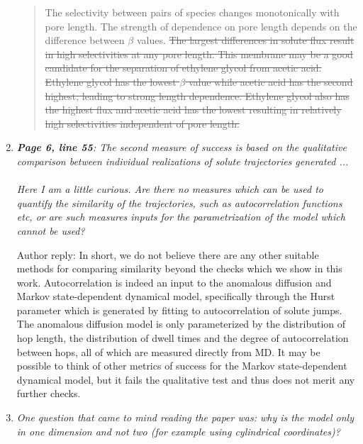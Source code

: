 \documentclass{article}
\begin{document}
\begin{enumerate}[label={Comment \theenumi :}, leftmargin=3.9\parindent]
\begin{quote}
          The selectivity between pairs of species changes monotonically with
	      pore length. The strength of dependence on pore length depends on
	      the difference between $\beta$ values. 
	      \sout{The largest differences in solute
	      flux result in high selectivities at any pore length. This membrane
	      may be a good candidate for the separation of ethylene glycol from
	      acetic acid. Ethylene glycol has the lowest $\beta$ value while
	      acetic acid has the second highest, leading to strong length
	      dependence. Ethylene glycol also has the highest flux and acetic acid
	      has the lowest resulting in relatively high selectivities independent
	      of pore length.}
	  
        \end{quote}
		
  \item \textit{\textbf{Page 6, line 55}: The second measure of success is based on the qualitative
        comparison between individual realizations of solute trajectories generated ...\\ \\
		Here I am a little curious. Are there no measures which can be used to quantify the similarity of
		the trajectories, such as autocorrelation functions etc, or are such measures inputs for the
		parametrization of the model which cannot be used?}
		
		Author reply: In short, we do not believe there are any other suitable methods for comparing
		similarity beyond the checks which we show in this work. Autocorrelation is indeed an input 
		to the anomalous diffusion and Markov state-dependent dynamical model, specifically through
		the Hurst parameter which is generated by fitting to autocorrelation of solute jumps. The
		anomalous diffusion model is only parameterized by the distribution of hop length, the 
		distribution of dwell times and the degree of autocorrelation between hops, all of which
		are measured directly from MD. It may be possible to think of other metrics of success
		for the Markov state-dependent dynamical model, but it fails the qualitative test and
		thus does not merit any further checks.
		
  \item \textit{One question that came to mind reading the paper was: why is the model only in 
  		one dimension and not two (for example using cylindrical coordinates)?}

    

\end{enumerate}
\end{document}
